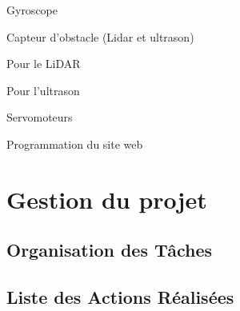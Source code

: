 \documentclass[a4paper,12pt]{report}  %
\begin{document}
Gyroscope

Capteur d’obstacle (Lidar et ultrason)

Pour le LiDAR

Pour l’ultrason

Servomoteurs




Programmation du site web




\section{Gestion du projet}

\subsection{Organisation des Tâches}


\subsection{Liste des Actions Réalisées}
\end{document}
